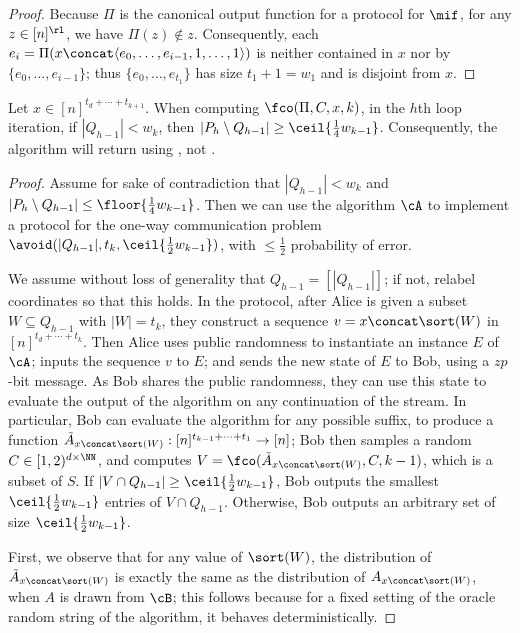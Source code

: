 \begin{itemize}
\begin{itemize}
\begin{proof}
  Because $\Pi$ is the canonical output function for a protocol for $\mif$,
  for any $z \in [n]^\rl$, we have $\Pi(z) \notin z$. Consequently, each $e_i
  = \Pi(x \concat \langle e_0, \ldots, e_{i-1}, 1, \ldots, 1\rangle)$ is
  neither contained in $x$ nor by $\{e_0,\ldots,e_{i-1}\}$; thus
  $\{e_0,\ldots,e_{t_1}\}$ has size $t_1 + 1 = w_1$ and is disjoint from $x$.
\end{proof}

\begin{lemma}\label{lem:pd-set-growth}
  Let $x \in [n]^{t_d+\cdots+t_{k+1}}$. 
  When computing $\fco(\Pi,C,x,k)$, in the $h$th loop iteration, if $|Q_{h -
  1}| < w_k$, then $|P_h \setminus Q_{h-1}| \ge \ceil{\frac{1}{4} w_{k-1}}$.
  Consequently, the algorithm will return using ,
  not .
\end{lemma}
%
\begin{proof}%
  Assume for sake of contradiction that $|Q_{h - 1}| < w_k$ and $|P_h
  \setminus Q_{h-1}| \le \floor{\frac{1}{4} w_{k-1}}$. Then we can use the
  algorithm $\cA$ to implement a protocol for the one-way communication
  problem $\avoid(|Q_{h-1}|, t_k, \ceil{\frac{1}{2} w_{k-1}})$, with $\le
  \frac{1}{2}$ probability of error.
  
  We assume without loss of generality that $Q_{h-1} = [|Q_{h-1}|]$; if not,
  relabel coordinates so that this holds. In the protocol, after Alice is
  given a subset $W \subseteq Q_{h-1}$ with $|W| = t_k$, they construct a
  sequence $v = x \concat \sort(W)$ in $[n]^{t_d + \cdots + t_k}$.  Then Alice
  uses public randomness to instantiate an instance $E$ of $\cA$;  inputs the
  sequence $v$ to $E$; and sends the new state of $E$ to Bob, using a $z
  p$-bit message. As Bob shares the public randomness,  they can use this
  state to evaluate the output of the algorithm on any continuation of the
  stream. In particular, Bob can evaluate the algorithm for any possible
  suffix, to produce a function $\tilde{A}_{x \concat \sort(W)} :
  [n]^{t_{k-1}+\cdots+t_1} \rightarrow [n]$; Bob then samples a random $C \in
  [1,2)^{d \times \NN}$, and computes $V = \fco(\tilde{A}_{x \concat
  \sort(W)}, C, k-1)$, which is a subset of $S$. If $|V \cap Q_{h-1}| \ge
  \ceil{\frac{1}{2} w_{k-1}}$, Bob outputs the smallest $\ceil{\frac{1}{2}
  w_{k-1}}$ entries of $V \cap Q_{h-1}$. Otherwise, Bob outputs an arbitrary
  set of size $\ceil{\frac{1}{2} w_{k-1}}$.
  
  First, we observe that for any value of $\sort(W)$, the distribution of
  $\tilde{A}_{x \concat \sort(W)}$
  is exactly the same as the distribution of $A_{x \concat \sort(W)}$, when $A$ is drawn from $\cB$;
  this follows because for a fixed setting of the oracle random string of the algorithm,
  it behaves deterministically.
  

\end{proof}
\end{itemize}
\end{itemize}
